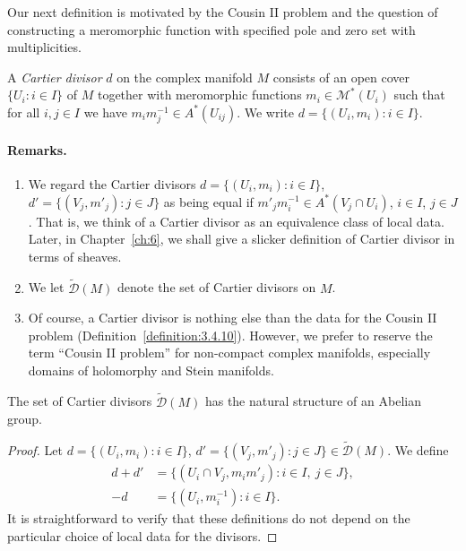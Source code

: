 Our next definition is motivated by the Cousin II problem and the question of constructing a meromorphic function with specified pole and zero set with multiplicities.

 A \emph{Cartier divisor} $d$ on the complex manifold $M$ consists of an open cover $\{U_i:i\in I\}$ of $M$ together with meromorphic functions $m_i\in\mathcal M^*(U_i)$ such that for all $i,j\in I$ we have $m_im_j^{-1}\in A^*(U_{ij})$. We write $d=\{(U_i,m_i):i\in I\}$.

\paragraph*{Remarks.}
\begin{enumerate}
\item We regard the Cartier divisors $d=\{(U_i,m_i):i\in I\}$, $d'=\{(V_j,m'_j):j\in J\}$ as being equal if $m'_jm_i^{-1}\in A^*(V_j\cap U_i)$, $i\in I$, $j\in J$. That is, we think of a Cartier divisor as an equivalence class of local data. Later, in Chapter~\ref{ch:6}, we shall give a slicker definition of Cartier divisor in terms of sheaves.
\item We let $\widetilde{\mathcal D}(M)$ denote the set of Cartier divisors on $M$.
\item Of course, a Cartier divisor is nothing else than the data for the Cousin II problem (Definition~\ref{definition:3.4.10}). However, we prefer to reserve the term ``Cousin II problem'' for non-compact complex manifolds, especially domains of holomorphy and Stein manifolds.
\end{enumerate}

 The set of Cartier divisors $\widetilde{\mathcal D}(M)$ has the natural structure of an Abelian group.
\begin{proof}
Let $d=\{(U_i,m_i):i\in I\}$, $d'=\{(V_j,m'_j):j\in J\}\in\widetilde{\mathcal D}(M)$. We define
\[
\begin{aligned}
d+d'&=\{(U_i\cap V_j,m_im'_j):i\in I,\ j\in J\},\\
-d&=\{(U_i,m_i^{-1}):i\in I\}.
\end{aligned}
\]
It is straightforward to verify that these definitions do not depend on the particular choice of local data for the divisors.
\end{proof}

